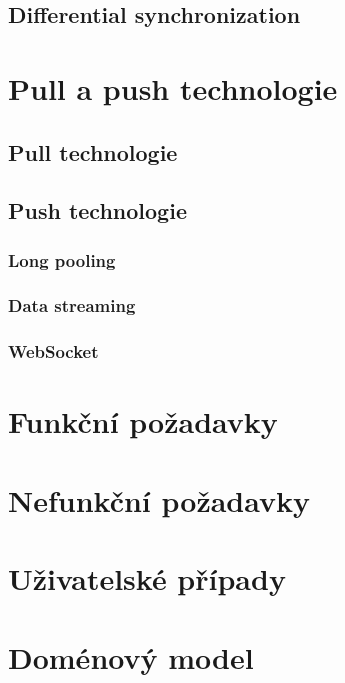 \subsection{Differential synchronization}

\section{Pull a push technologie}
\subsection{Pull technologie}
\subsection{Push technologie}
\subsubsection{Long pooling}
\subsubsection{Data streaming}
\subsubsection{WebSocket}

\section{Funkční požadavky}
\section{Nefunkční požadavky}
\section{Uživatelské případy}
\section{Doménový model}
